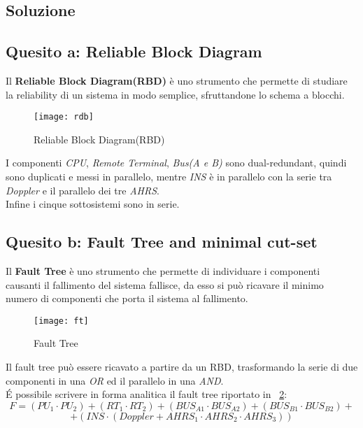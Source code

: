\clearpage
\subsection{Soluzione}

\subsection{Quesito a: Reliable Block Diagram}

Il \textbf{Reliable Block Diagram(RBD)} è uno strumento che permette di studiare
la reliability di un sistema in modo semplice, sfruttandone lo schema a blocchi.\\

\begin{figure}[!htbp]
  \centering
  \texttt{[image: rdb]}
  \caption{Reliable Block Diagram(RBD)}
  \label{rdb}
\end{figure}

I componenti \textit{CPU}, \textit{Remote Terminal}, \textit{Bus(A e B)} sono
dual-redundant, quindi sono duplicati e messi in parallelo, mentre \textit{INS} è
in parallelo con la serie tra \textit{Doppler} e il parallelo dei tre \textit{AHRS}.\\
Infine i cinque sottosistemi sono in serie.

\subsection{Quesito b: Fault Tree and minimal cut-set}

Il \textbf{Fault Tree} è uno strumento che permette di individuare i componenti
causanti il fallimento del sistema fallisce, da esso si può ricavare il minimo numero di
componenti che porta il sistema al fallimento.

\begin{figure}[!htbp]
  \centering
  \texttt{[image: ft]}
  \caption{Fault Tree}
  \label{ft}
\end{figure}

Il fault tree può essere ricavato a partire da un RBD, trasformando
la serie di due componenti in una \textit{OR} ed il parallelo in una \textit{AND}.\\

\'E possibile scrivere in forma analitica il fault tree riportato in \figurename~\ref{ft}:
$$ F = (PU_1 \cdot PU_2) + (RT_1 \cdot RT_2) + (BUS_{A1} \cdot BUS_{A2}) + (BUS_{B1} \cdot BUS_{B2})+$$
$$+ (INS \cdot (Doppler+AHRS_1 \cdot AHRS_2 \cdot AHRS_3))$$

